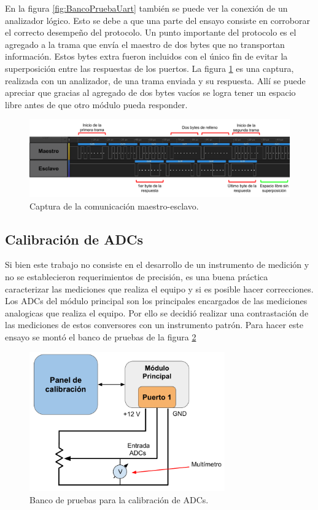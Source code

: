 En la figura \ref{fig:BancoPruebaUart} también se puede ver la conexión de un analizador lógico. Esto se debe a que una parte del ensayo consiste en corroborar el correcto desempeño del protocolo. 
Un punto importante del protocolo es el agregado a la trama que envía el maestro de dos bytes que no transportan información. Estos bytes extra fueron incluidos con el único fin de evitar la superposición entre las respuestas de los puertos. 
La figura \ref{fig:CapturaAnalizador} es una captura, realizada con un analizador, de una trama enviada y su respuesta. Allí se puede apreciar que gracias al agregado de dos bytes vacíos se logra tener un espacio libre antes de que otro módulo pueda responder.

\begin{figure}[H]
	\centering
	\includegraphics[width=1\textwidth]{./Figures/CapturaAnalizador.pdf}
	\caption{Captura de la comunicación maestro-esclavo.}
	\label{fig:CapturaAnalizador}
\end{figure}

\subsection{Calibración de ADCs}

Si bien este trabajo no consiste en el desarrollo de un instrumento de medición y no se establecieron requerimientos de precisión, es una buena práctica caracterizar las mediciones que realiza el equipo y si es posible hacer correcciones. 
Los ADCs del módulo principal son los principales encargados de las mediciones analogicas que realiza el equipo. Por ello se decidió realizar una contrastación de las mediciones de estos conversores con un instrumento patrón. Para hacer este ensayo se montó el banco de pruebas de la figura \ref{fig:BancoCal}

\begin{figure}[H]
	\centering
	\includegraphics[width=0.75\textwidth]{./Figures/BancoCal.pdf}
	\caption{Banco de pruebas para la calibración de ADCs.}
	\label{fig:BancoCal}
\end{figure}

